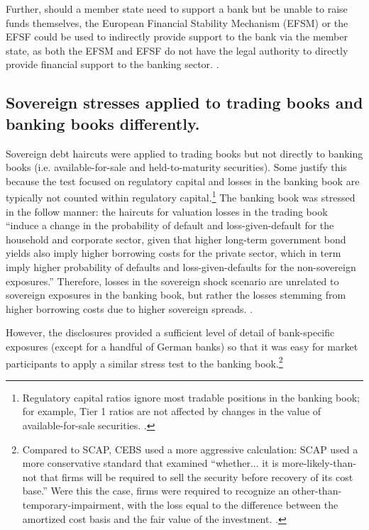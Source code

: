 \documentclass[12pt]{article}
\begin{document}
Further, should a member state need to support a bank but be unable to raise funds themselves, the European Financial Stability Mechanism (EFSM) or the EFSF could be used to indirectly provide support to the bank via the member state, as both the EFSM and EFSF do not have the legal authority to directly provide financial support to the banking sector. \citep{QA}.


\subsection{Sovereign stresses applied to trading books and banking books differently.}

Sovereign debt haircuts were applied to trading books but not directly to banking books (i.e. available-for-sale and held-to-maturity securities). Some justify this because the test focused on regulatory capital and losses in the banking book are typically not counted within regulatory capital.\footnote{Regulatory capital ratios ignore most tradable positions in the banking book; for example, Tier 1 ratios are not affected by changes in the value of available-for-sale securities. \citet{Deutsche}.} The banking book was stressed in the follow manner: the haircuts for valuation losses in the trading book ``induce a change in the probability of default and loss-given-default for the household and corporate sector, given that higher long-term government bond yields also imply higher borrowing costs for the private sector, which in term imply higher probability of defaults and loss-given-defaults for the non-sovereign exposures.'' Therefore, losses in the sovereign shock scenario are unrelated to sovereign exposures in the banking book, but rather the losses stemming from higher borrowing costs due to higher sovereign spreads. \citep{Samuels}.

However, the disclosures provided a sufficient level of detail of bank-specific exposures (except for a handful of German banks) so that it was easy for market participants to apply a similar stress test to the banking book.\footnote{Compared to SCAP, CEBS used a more aggressive calculation: SCAP used a more conservative standard that examined ``whether... it is more-likely-than-not that firms will be required to sell the security before recovery of its cost base.'' Were this the case, firms were required to recognize an other-than-temporary-impairment, with the loss equal to the difference between the amortized cost basis and the fair value of the investment. \citep{SCAPResults}.}
\end{document}
